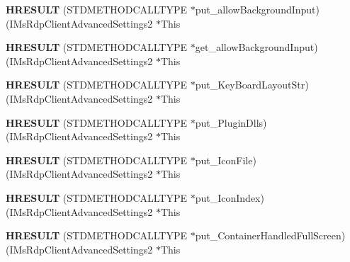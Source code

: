 \begin{DoxyCompactItemize}
{\bfseries H\+R\+E\+S\+U\+LT} (S\+T\+D\+M\+E\+T\+H\+O\+D\+C\+A\+L\+L\+T\+Y\+PE $\ast$put\+\_\+allow\+Background\+Input)(I\+Ms\+Rdp\+Client\+Advanced\+Settings2 $\ast$This
\item 
\mbox{\label{struct_i_ms_rdp_client_advanced_settings2_vtbl_a2fac0b3cb9b6a5890997b5a63b46699d}} 
{\bfseries H\+R\+E\+S\+U\+LT} (S\+T\+D\+M\+E\+T\+H\+O\+D\+C\+A\+L\+L\+T\+Y\+PE $\ast$get\+\_\+allow\+Background\+Input)(I\+Ms\+Rdp\+Client\+Advanced\+Settings2 $\ast$This
\item 
\mbox{\label{struct_i_ms_rdp_client_advanced_settings2_vtbl_a16cfb2cc82f8b788aa42e463b0cd2542}} 
{\bfseries H\+R\+E\+S\+U\+LT} (S\+T\+D\+M\+E\+T\+H\+O\+D\+C\+A\+L\+L\+T\+Y\+PE $\ast$put\+\_\+\+Key\+Board\+Layout\+Str)(I\+Ms\+Rdp\+Client\+Advanced\+Settings2 $\ast$This
\item 
\mbox{\label{struct_i_ms_rdp_client_advanced_settings2_vtbl_ad1855b3159897c44a9df30ea3eb31762}} 
{\bfseries H\+R\+E\+S\+U\+LT} (S\+T\+D\+M\+E\+T\+H\+O\+D\+C\+A\+L\+L\+T\+Y\+PE $\ast$put\+\_\+\+Plugin\+Dlls)(I\+Ms\+Rdp\+Client\+Advanced\+Settings2 $\ast$This
\item 
\mbox{\label{struct_i_ms_rdp_client_advanced_settings2_vtbl_ac7e25aaaa211e4a345cd58857fafb951}} 
{\bfseries H\+R\+E\+S\+U\+LT} (S\+T\+D\+M\+E\+T\+H\+O\+D\+C\+A\+L\+L\+T\+Y\+PE $\ast$put\+\_\+\+Icon\+File)(I\+Ms\+Rdp\+Client\+Advanced\+Settings2 $\ast$This
\item 
\mbox{\label{struct_i_ms_rdp_client_advanced_settings2_vtbl_a8c3b158f280bb9a97017c4115a07f47e}} 
{\bfseries H\+R\+E\+S\+U\+LT} (S\+T\+D\+M\+E\+T\+H\+O\+D\+C\+A\+L\+L\+T\+Y\+PE $\ast$put\+\_\+\+Icon\+Index)(I\+Ms\+Rdp\+Client\+Advanced\+Settings2 $\ast$This
\item 
\mbox{\label{struct_i_ms_rdp_client_advanced_settings2_vtbl_a5073689f9057bb9b587e47c7f9a85615}} 
{\bfseries H\+R\+E\+S\+U\+LT} (S\+T\+D\+M\+E\+T\+H\+O\+D\+C\+A\+L\+L\+T\+Y\+PE $\ast$put\+\_\+\+Container\+Handled\+Full\+Screen)(I\+Ms\+Rdp\+Client\+Advanced\+Settings2 $\ast$This

\end{DoxyCompactItemize}

